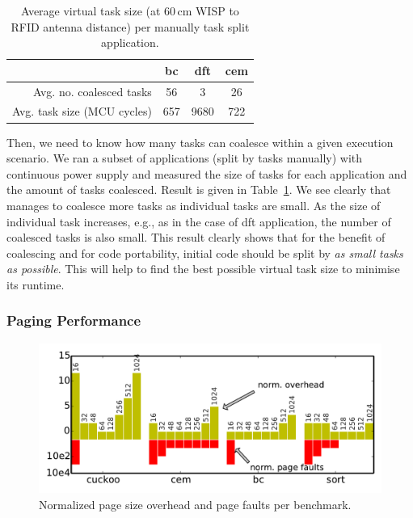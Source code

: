 \begin{table}
	\centering
	\footnotesize
	\begin{tabular}{|r|c|c|c|}
		\hline
		{} & bc & dft & cem \\
		\hline\hline
		Avg. no. coalesced tasks & 56 & 3 & 26 \\
		Avg. task size (MCU cycles) & 657 & 9680 & 722 \\
		\hline
	\end{tabular}
\caption{Average \sys virtual task size (at 60\,cm WISP to RFID antenna distance) per manually task split application.}
\label{tab:aveVirtuTaskSize}
\end{table}


Then, we need to know how many tasks \sys can coalesce within a given execution scenario. We ran a subset of applications (split by tasks manually) with continuous power supply and measured the size of tasks for each application and the amount of tasks coalesced. Result is given in Table~\ref{tab:aveVirtuTaskSize}. We see clearly that \sys manages to coalesce more tasks as individual tasks are small. As the size of individual task increases, e.g., as in the case of dft application, the number of coalesced tasks is also small. This result clearly shows that for the benefit of coalescing and for code portability, initial code should be split by \emph{as small tasks as possible}. This will help \sys to find the best possible virtual task size to minimise its runtime.

\subsubsection{\sys Paging Performance}
\label{sec:results_memory_management}

\begin{figure}
	\centering
	\includegraphics[width=\columnwidth]{figures/pagSizeOverhead}
	\caption{Normalized page size overhead and page faults per benchmark.}
	\label{fig:IPOSPerformance}
	\label{fig:page_size}
\end{figure}

